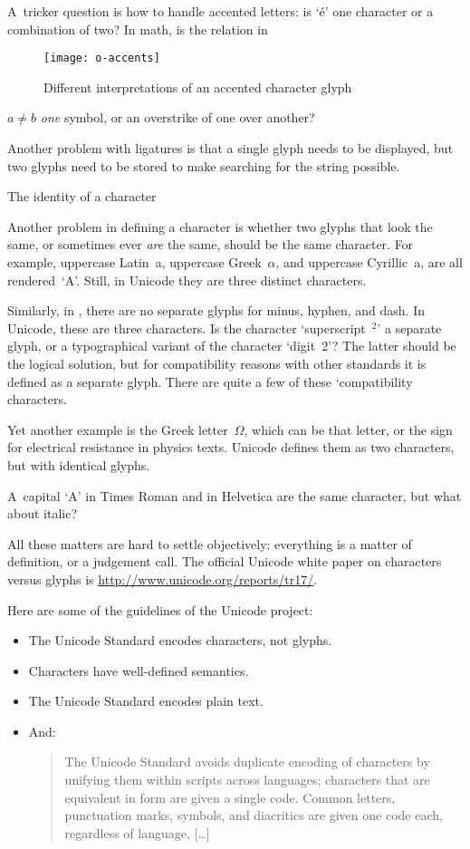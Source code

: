 A~tricker question is how to handle accented letters: is `\'e' one
character or a combination of two? In math, is the relation in
\begin{figure}[ht]
\texttt{[image: o-accents]}
\caption{Different interpretations of an accented character glyph}
\label{fig:o-accent}
\end{figure}
$a\not=b$ {\em one} symbol, or an overstrike of one over another?

Another problem with ligatures is that a single glyph needs to be
displayed, but two glyphs need to be stored to make searching for the
string possible.

 {The identity of a character}

Another problem in defining a character is whether two glyphs that
look the same, or sometimes ever {\em are} the same, should be the
same character. For example, uppercase Latin~a, uppercase
Greek~$\alpha$, and uppercase Cyrillic~a, are all rendered~`A'. Still,
in Unicode they are three distinct characters.

Similarly, in \ascii, there are no separate glyphs for minus, hyphen,
and dash. In Unicode, these are three characters. Is the character
`superscript~$^2$' a separate glyph, or a typographical variant of the
character `digit~2'? The latter should be the logical solution, but
for compatibility reasons with other standards it is defined as a
separate glyph. There are quite a few of these `compatibility characters.

Yet another example is the Greek letter~$\Omega$, which can be that
letter, or the sign for electrical resistance in physics
texts. Unicode defines them as two characters, but with identical
glyphs.

A~capital `A' in Times Roman and in Helvetica are the same character,
but what about italic?

All these matters are hard to settle objectively: everything is a
matter of definition, or a judgement call. The official Unicode white
paper on characters versus glyphs is
\url{http://www.unicode.org/reports/tr17/}.

Here are some of the guidelines of the Unicode project:
\begin{itemize}
\item The Unicode Standard encodes characters, not glyphs.
\item Characters have well-defined semantics.
\item The Unicode Standard encodes plain text.
\item And:
\begin{quotation}
The Unicode Standard avoids duplicate encoding of characters by
unifying them within scripts across languages; characters that are
equivalent in form are given a single code. Common letters,
punctuation marks, symbols, and diacritics are given one code each,
regardless of language, [\dots]
\end{quotation}
\end{itemize}

